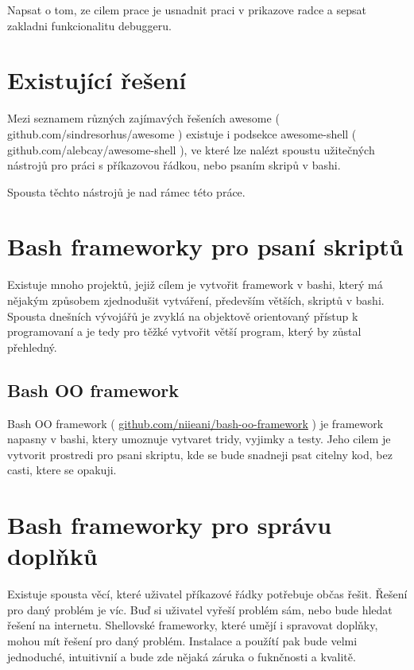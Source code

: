 \documentclass[thesis=M,czech]{FITthesis}[2012/06/26]
\begin{document}
Napsat o tom, ze cilem prace je usnadnit praci v prikazove radce a sepsat zakladni funkcionalitu debuggeru.





\section{Existující řešení}

Mezi seznamem různých zajímavých řešeních awesome ( github.com/sindresorhus/awesome ) existuje i podsekce awesome-shell ( github.com/alebcay/awesome-shell ), ve které lze nalézt spoustu užitečných nástrojů pro práci s příkazovou řádkou, nebo psaním skripů v bashi.

Spousta těchto nástrojů je nad rámec této práce. 


\section{Bash frameworky pro psaní skriptů}

Existuje mnoho projektů, jejiž cílem je vytvořit framework v bashi, který má nějakým způsobem zjednodušit vytváření, především větších, skriptů v bashi. Spousta dnešních vývojářů je zvyklá na objektově orientovaný přístup k programovaní a je tedy pro těžké vytvořit větší program, který by zůstal přehledný.

\subsection{Bash OO framework}
Bash OO framework ( \url{github.com/niieani/bash-oo-framework} ) je framework napasny v bashi, ktery umoznuje vytvaret tridy, vyjimky a testy. Jeho cilem je vytvorit prostredi pro psani skriptu, kde se bude snadneji psat citelny kod, bez casti, ktere se opakuji.

%
%
%
%
%

\section{Bash frameworky pro správu doplňků}

Existuje spousta věcí, které uživatel příkazové řádky potřebuje občas řešit. Řešení pro daný problém je víc. Buď si uživatel vyřeší problém sám, nebo bude hledat řešení na internetu. Shellovské frameworky, které umějí i spravovat doplňky, mohou mít řešení pro daný problém. Instalace a použítí pak bude velmi jednoduché, intuitivnií a bude zde nějaká záruka o fuknčnosti a kvalitě.
\end{document}
